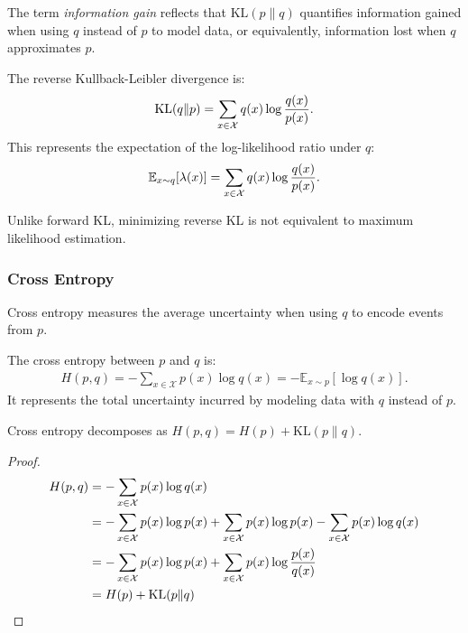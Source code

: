 The term \textit{information gain} reflects that $\text{KL}(p \| q)$ quantifies information gained when using $q$ instead of $p$ to model data, or equivalently, information lost when $q$ approximates $p$.

\begin{definition}
  The \textnormal{\sffamily reverse Kullback-Leibler divergence} is:
  \begin{align}
    \label{eq:reverse-KL}
    \text{KL}(q \| p) = \sum_{x \in \mathcal{X}} q(x) \log{q(x) \over p(x)}.
  \end{align}
  This represents the expectation of the log-likelihood ratio under $q$:
  \begin{align}
    \mathbb{E}_{x \sim q}[\lambda(x)] = \sum_{x \in \mathcal{X}} q(x)\log {q(x) \over p(x)}.
  \end{align}
\end{definition}
Unlike forward KL, minimizing reverse KL is not equivalent to maximum likelihood estimation.

\subsubsection{Cross Entropy}
Cross entropy measures the average uncertainty when using $q$ to encode events from $p$.

\begin{definition}
  The \textnormal{\sffamily cross entropy} between $p$ and $q$ is:
  \begin{align}
    H(p, q) = - \sum_{x \in \mathcal{X}} p(x) \log q(x) = -\mathbb{E}_{x \sim p}\left[\log{q(x)}\right].
  \end{align}
  It represents the total uncertainty incurred by modeling data with $q$ instead of $p$.
\end{definition}

\begin{lemma}
  Cross entropy decomposes as $H(p, q) = H(p) + \text{KL}(p \| q)$.
\end{lemma}
\begin{proof}
\begin{align}
  H(p, q) & = -\sum_{x \in \mathcal{X}} p(x) \log q(x) \\
          & = -\sum_{x \in \mathcal{X}} p(x) \log p(x) + \sum_{x \in \mathcal{X}} p(x) \log p(x) - \sum_{x \in \mathcal{X}} p(x) \log q(x) \\
          & = -\sum_{x \in \mathcal{X}} p(x) \log p(x) + \sum_{x \in \mathcal{X}} p(x) \log {p(x) \over q(x)} \\
          & = H(p) + \text{KL}(p \| q)
\end{align}
\end{proof}

